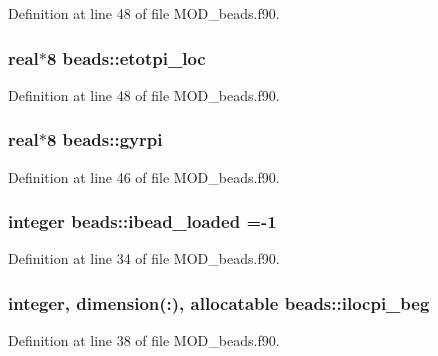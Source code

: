 Definition at line 48 of file M\-O\-D\-\_\-beads.\-f90.

\hypertarget{classbeads_a87c74fb99bcb48d84020dc5754a8b64f}{
\subsubsection[{etotpi\-\_\-loc}]{\setlength{\rightskip}{0pt plus 5cm}real$\ast$8 beads\-::etotpi\-\_\-loc}}\label{classbeads_a87c74fb99bcb48d84020dc5754a8b64f}


Definition at line 48 of file M\-O\-D\-\_\-beads.\-f90.

\hypertarget{classbeads_a4dbbfebe3132090b108afcbb993f7a3f}{
\subsubsection[{gyrpi}]{\setlength{\rightskip}{0pt plus 5cm}real$\ast$8 beads\-::gyrpi}}\label{classbeads_a4dbbfebe3132090b108afcbb993f7a3f}


Definition at line 46 of file M\-O\-D\-\_\-beads.\-f90.

\hypertarget{classbeads_abb845f8ec585fbfc83b865944e087f39}{
\subsubsection[{ibead\-\_\-loaded}]{\setlength{\rightskip}{0pt plus 5cm}integer beads\-::ibead\-\_\-loaded =-\/1}}\label{classbeads_abb845f8ec585fbfc83b865944e087f39}


Definition at line 34 of file M\-O\-D\-\_\-beads.\-f90.

\hypertarget{classbeads_a901a3bc633365aca7062d140a758bed2}{
\subsubsection[{ilocpi\-\_\-beg}]{\setlength{\rightskip}{0pt plus 5cm}integer, dimension(\-:), allocatable beads\-::ilocpi\-\_\-beg}}\label{classbeads_a901a3bc633365aca7062d140a758bed2}


Definition at line 38 of file M\-O\-D\-\_\-beads.\-f90.

